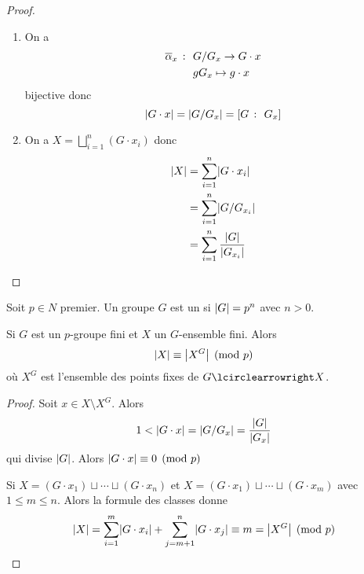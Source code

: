 \begin{proof}\,
    \begin{enumerate}[label=(\roman*)] %
        \item On a 
        \begin{equation*}
            \begin{aligned}
                \overline{\alpha}_x\ \colon\  &G/G_x\to G\cdot x\\
                &gG_x\mapsto g\cdot x
            \end{aligned}
        \end{equation*}
        bijective donc
        \begin{equation*}
            \mathopen{}\left|G\cdot x\right|\mathclose{} = \mathopen{}\left|G/G_x\right|\mathclose{} = \mathopen{}\left[G\ \colon\  G_x\right]\mathclose{}
        \end{equation*}

        \item On a \(X = \bigsqcup_{i=1}^n (G\cdot x_i)\) donc
        \begin{equation*}
            \begin{aligned}
                \mathopen{}\left|X\right|\mathclose{}
                &= \sum_{i=1}^n \mathopen{}\left|G\cdot x_i\right|\mathclose{}\\
                &= \sum_{i=1}^n \mathopen{}\left|G/G_{x_i}\right|\mathclose{}\\
                &= \sum_{i=1}^n \frac{\mathopen{}\left|G\right|\mathclose{}}{\mathopen{}\left|G_{x_{i}}\right|\mathclose{}}
            \end{aligned}
        \end{equation*}
    \end{enumerate}
\end{proof}

\begin{definition}
    Soit \(p\in N\) premier. Un groupe \(G\)
    est un  si \(\mathopen{}\left|G\right|\mathclose{} = p^n\)
    avec \(n>0\).
\end{definition}

\begin{lemma}
    Si \(G\) est un \(p\)-groupe fini et \(X\) un \(G\)-ensemble fini.
    Alors
    \begin{equation*}
        \mathopen{}\left|X\right|\mathclose{} \equiv \mathopen{}\left|X^G\right|\mathclose{} \pmod p
    \end{equation*}
    où \(X^G\) est l'ensemble des points fixes de \(G\act X\).
\end{lemma}

\begin{proof}
    Soit \(x\in X\setminus X^G\). Alors
    \begin{equation*}
        1 < \mathopen{}\left|G\cdot x\right|\mathclose{} = \mathopen{}\left|G/G_x\right|\mathclose{} = \frac{\mathopen{}\left|G\right|\mathclose{}}{\mathopen{}\left|G_{x}\right|\mathclose{}}
    \end{equation*}
    qui divise \(\mathopen{}\left|G\right|\mathclose{}\). Alors \(\mathopen{}\left|G\cdot x\right|\mathclose{}\equiv 0 \pmod p\)

    Si \(X = (G\cdot x_1)\sqcup\cdots\sqcup (G\cdot x_n)\) et 
    \(X = (G\cdot x_1)\sqcup\cdots\sqcup (G\cdot x_m)\) avec \(1\leq m\leq n\).
    Alors la formule des classes donne
    \begin{equation*}
        \mathopen{}\left|X\right|\mathclose{} = \sum_{i=1}^m \mathopen{}\left|G\cdot x_i\right|\mathclose{} + \sum_{j = m+1}^n \mathopen{}\left|G\cdot x_j\right|\mathclose{}
        \equiv m = \mathopen{}\left|X^G\right|\mathclose{}\pmod p
    \end{equation*}
\end{proof}

